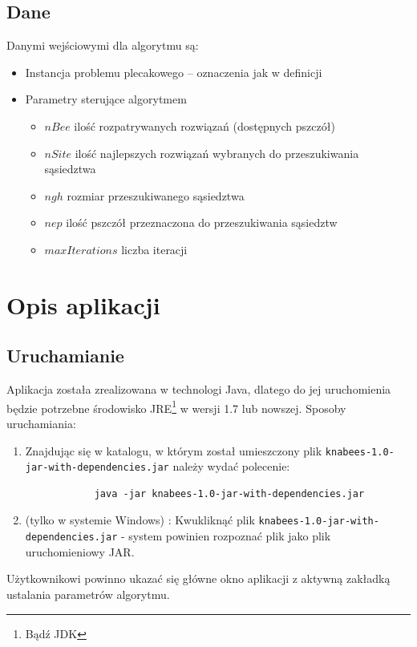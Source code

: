 \documentclass[a4paper,12pt,notitlepage]{mwrep}
\begin{document}
\section{Dane}
Danymi wejściowymi dla algorytmu są:
\begin{itemize}
\item Instancja problemu plecakowego -- oznaczenia jak w definicji
\item Parametry sterujące algorytmem
\begin{itemize}
\item $nBee$ ilość rozpatrywanych rozwiązań (dostępnych pszczół)
\item $nSite$ ilość najlepszych rozwiązań wybranych do przeszukiwania sąsiedztwa
\item $ngh$ rozmiar przeszukiwanego sąsiedztwa
\item $nep$ ilość pszczół przeznaczona do przeszukiwania sąsiedztw
\item $maxIterations$ liczba iteracji
\end{itemize}
\end{itemize}

\chapter{Opis aplikacji}
\section{Uruchamianie}
Aplikacja została zrealizowana w technologi Java, dlatego do jej uruchomienia będzie
potrzebne środowisko JRE\footnote{Bądź JDK} w wersji 1.7 lub nowszej.
Sposoby uruchamiania:
\begin{enumerate}
	\item	Znajdując się w katalogu, w którym został umieszczony plik \texttt{knabees-1.0-jar-with-dependencies.jar}
			należy wydać polecenie:
			\begin{verbatim}
			java -jar knabees-1.0-jar-with-dependencies.jar
			\end{verbatim}
	\item	(tylko w systemie Windows) : Kwukliknąć plik \texttt{knabees-1.0-jar-with-dependencies.jar}
			- system powinien rozpoznać plik jako plik uruchomieniowy JAR.
\end{enumerate}
Użytkownikowi powinno ukazać się główne okno aplikacji z aktywną zakładką ustalania parametrów
algorytmu.
\end{document}
